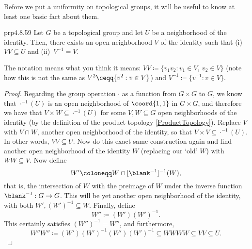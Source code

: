 Before we put a uniformity on topological groups, it will be useful to know at least one basic fact about them.
\begin{prp}{}{prp4.8.59}
Let $G$ be a topological group and let $U$ be a neighborhood of the identity.  Then, there exists an open neighborhood $V$ of the identity such that (i)~$VV\subseteq U$ and (ii)~$V^{-1}=V$.
\begin{rmk}
The notation means what you think it means:  $VV\coloneqq \{ v_1v_2:v_1\in V,\ v_2\in V\}$ (note how this is not the same as $V^2\ceqq \{ v^2:v\in V\}$) and $V^{-1}\coloneqq \{ v^{-1}:v\in V\}$.
\end{rmk}
\begin{proof}
Regarding the group operation $\cdot$ as a function from $G\times G$ to $G$, we know that $\cdot ^{-1}(U)$ is an open neighborhood of $\coord{1,1}$ in $G\times G$, and therefore we have that $V\times W\subseteq \cdot ^{-1}(U)$ for some $V,W\subseteq G$ open neighborhoods of the identity (by the definition of the product topology \cref{ProductTopology}).   Replace $V$ with $V\cap W$, another open neighborhood of the identity, so that $V\times V\subseteq \cdot ^{-1}(U)$.  In other words, $VV\subseteq U$.  Now do this exact same construction again and find another open neighborhood of the identity $W$ (replacing our `old' $W$) with $WW\subseteq V$.  Now define
\begin{equation}
W'\coloneqq W\cap [\blank ^{-1}]^{-1}(W),
\end{equation}
that is, the intersection of $W$ with the preimage of $W$ under the inverse function $\blank ^{-1}:G\rightarrow G$.  This will be yet another open neighborhood of the identity, with both $W',(W')^{-1}\subseteq W$.  Finally, define
\begin{equation}
W''\coloneqq (W')(W')^{-1}.
\end{equation}
This certainly satisfies $(W'')^{-1}=W''$, and furthermore,
\begin{equation}
W''W''\coloneqq (W')(W')^{-1}(W')(W')^{-1}\subseteq WWWW\subseteq VV\subseteq U.
\end{equation}
\end{proof}
\end{prp}

